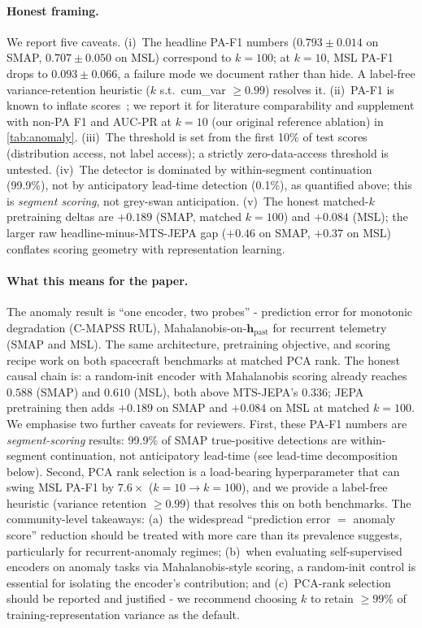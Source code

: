 \documentclass{article}
\newcommand{\h}{\mathbf{h}}
\begin{document}
\paragraph{Honest framing.} We report five caveats. (i)~The headline PA-F1 numbers ($0.793 \pm 0.014$ on SMAP, $0.707 \pm 0.050$ on MSL) correspond to $k=100$; at $k=10$, MSL PA-F1 drops to $0.093 \pm 0.066$, a failure mode we document rather than hide. A label-free variance-retention heuristic ($k$ s.t.\ cum\_var $\geq 0.99$) resolves it. (ii)~PA-F1 is known to inflate scores~\citep{schmidl2022tsadeval}; we report it for literature comparability and supplement with non-PA F1 and AUC-PR at $k=10$ (our original reference ablation) in \cref{tab:anomaly}. (iii)~The threshold is set from the first 10\% of test scores (distribution access, not label access); a strictly zero-data-access threshold is untested. (iv)~The detector is dominated by within-segment continuation (99.9\%), not by anticipatory lead-time detection (0.1\%), as quantified above; this is \emph{segment scoring}, not grey-swan anticipation. (v)~The honest matched-$k$ pretraining deltas are $+0.189$ (SMAP, matched $k{=}100$) and $+0.084$ (MSL); the larger raw headline-minus-MTS-JEPA gap ($+0.46$ on SMAP, $+0.37$ on MSL) conflates scoring geometry with representation learning.

\paragraph{What this means for the paper.} The anomaly result is ``one encoder, two probes'' - prediction error for monotonic degradation (C-MAPSS RUL), Mahalanobis-on-$\h_\text{past}$ for recurrent telemetry (SMAP and MSL). The same architecture, pretraining objective, and scoring recipe work on both spacecraft benchmarks at matched PCA rank. The honest causal chain is: a random-init encoder with Mahalanobis scoring already reaches $0.588$ (SMAP) and $0.610$ (MSL), both above MTS-JEPA's $0.336$; JEPA pretraining then adds $+0.189$ on SMAP and $+0.084$ on MSL at matched $k=100$. We emphasise two further caveats for reviewers. First, these PA-F1 numbers are \emph{segment-scoring} results: 99.9\% of SMAP true-positive detections are within-segment continuation, not anticipatory lead-time (see lead-time decomposition below). Second, PCA rank selection is a load-bearing hyperparameter that can swing MSL PA-F1 by $7.6\times$ ($k=10 \to k=100$), and we provide a label-free heuristic (variance retention $\geq 0.99$) that resolves this on both benchmarks. The community-level takeaways: (a)~the widespread ``prediction error $=$ anomaly score'' reduction should be treated with more care than its prevalence suggests, particularly for recurrent-anomaly regimes; (b)~when evaluating self-supervised encoders on anomaly tasks via Mahalanobis-style scoring, a random-init control is essential for isolating the encoder's contribution; and (c)~PCA-rank selection should be reported and justified - we recommend choosing $k$ to retain $\geq 99\%$ of training-representation variance as the default.
\end{document}
